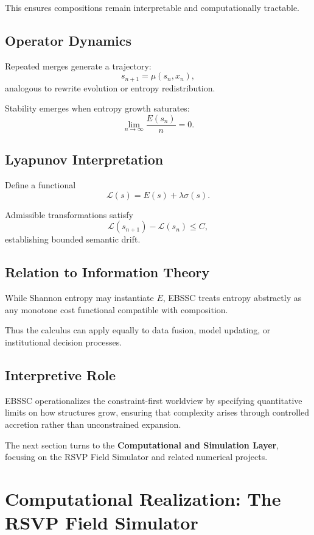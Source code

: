 \documentclass[12pt]{article}
\begin{document}
This ensures compositions remain interpretable and computationally tractable.

\subsection{Operator Dynamics}

Repeated merges generate a trajectory:
\[
s_{n+1}=\mu(s_n,x_n),
\]
analogous to rewrite evolution or entropy redistribution.

Stability emerges when entropy growth saturates:
\[
\lim_{n\to\infty}\frac{E(s_n)}{n}=0.
\]

\subsection{Lyapunov Interpretation}

Define a functional
\[
\mathcal{L}(s)=E(s)+\lambda\sigma(s).
\]

Admissible transformations satisfy
\[
\mathcal{L}(s_{n+1})-\mathcal{L}(s_n)\le C,
\]
establishing bounded semantic drift.

\subsection{Relation to Information Theory}

While Shannon entropy may instantiate $E$, EBSSC treats entropy abstractly as any monotone cost functional compatible with composition.

Thus the calculus can apply equally to data fusion, model updating, or institutional decision processes.

\subsection{Interpretive Role}

EBSSC operationalizes the constraint-first worldview by specifying quantitative limits on how structures grow, ensuring that complexity arises through controlled accretion rather than unconstrained expansion.

\bigskip

The next section turns to the \textbf{Computational and Simulation Layer}, focusing on the RSVP Field Simulator and related numerical projects.

\section{Computational Realization: The RSVP Field Simulator}
\end{document}
